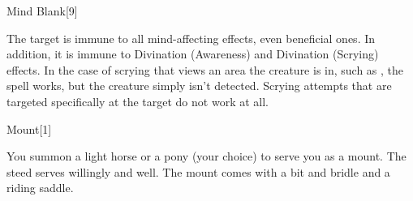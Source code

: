 \begin{spellsection}{Mind Blank}[9]
    \begin{spellheader}
    \end{spellheader}
    \begin{spellcontent}
        \begin{spelltargetinginfo}
            \spellrng{\rngclose}
        \end{spelltargetinginfo}
        \begin{spelleffects}

            \spelleffect The target is immune to all mind-affecting effects, even beneficial ones. In addition, it is immune to Divination (Awareness) and Divination (Scrying) effects. In the case of scrying that views an area the creature is in, such as , the spell works, but the creature simply isn't detected. Scrying attempts that are targeted specifically at the target do not work at all.
            \spelldur \durext
        \end{spelleffects}
    \end{spellcontent}
    \begin{spellfooter}
    \end{spellfooter}
\end{spellsection}

\begin{spellsection}{Mount}[1]
    \begin{spellheader}
    \end{spellheader}
    \begin{spellcontent}
        \begin{spelltargetinginfo}
            \spellrng{\rngclose}
        \end{spelltargetinginfo}
        \begin{spelleffects}

            \spellline
            \spelleffect You summon a light horse or a pony (your choice) to serve you as a mount. The steed serves willingly and well. The mount comes with a bit and bridle and a riding saddle.
            \spelldur \durext \dismissable
        \end{spelleffects}
    \end{spellcontent}
    \begin{spellfooter}
    \end{spellfooter}
\end{spellsection}

